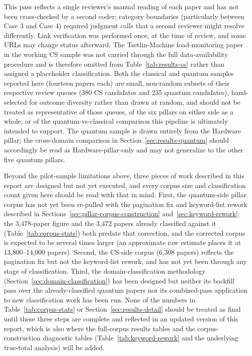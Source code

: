 \documentclass[11pt]{article}
\begin{document}
This pass reflects a single reviewer's manual reading of each paper and has not been
cross-checked by a second coder; category boundaries (particularly between Case 3 and
Case 4) required judgment calls that a second reviewer might resolve differently.
Link verification was performed once, at the time of review, and some URLs may change
status afterward. The Tsetlin-Machine load-monitoring paper in the working CS sample was
not carried through the full data-availability procedure and is therefore omitted from
Table~\ref{tab:results-cs} rather than assigned a placeholder classification. Both the
classical and quantum samples reported here (fourteen papers each) are small,
non-random subsets of their respective review queues (380 CS candidates and 235
quantum candidates), hand-selected for outcome diversity rather than drawn at random,
and should not be treated as representative of those queues, of the six pillars on
either side as a whole, or of the quantum-vs-classical comparison this pipeline is
ultimately intended to support. The quantum sample is drawn entirely from the Hardware
pillar; the cross-domain comparison in Section~\ref{sec:results-quantum} should
accordingly be read as Hardware-pillar-only and may not generalize to the other five
quantum pillars.

Beyond the pilot-sample limitations above, three pieces of work described in this
report are designed but not yet executed, and every corpus size and classification
count given here should be read with that in mind. First, the quantum-side pillar
corpus has not yet been re-pulled with the pagination fix and keyword-list rework
described in Sections~\ref{sec:pillar-corpus-construction}
and~\ref{sec:keyword-rework}; the 3{,}478-paper figure and the 3{,}472 papers already
classified against it (Table~\ref{tab:corpus-stats}) both predate that correction, and
the corrected corpus is expected to be several times larger (an approximate
raw estimate places it at 13{,}800--14{,}000 papers). Second, the CS-side corpus
(6{,}308 papers) reflects the pagination fix but not the keyword-list rework, and has
not yet been through any stage of classification. Third, the domain-classification
methodology (Section~\ref{sec:domain-classification}) has been designed but neither
its backfill pass over the already-classified quantum papers nor its combined-pass
application to new classification work has been run. None of the numbers in
Table~\ref{tab:corpus-stats} or Section~\ref{sec:results-detail} should be treated as
final until these three steps are complete and reflected in an updated version of this
report, which is also where the full-corpus results tables and the corpus-construction
diagnostic tables (Table~\ref{tab:keyword-rework} and the underlying true-total
analysis) will be added.
\end{document}
